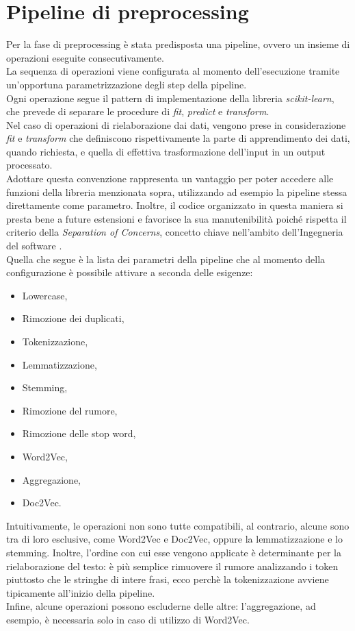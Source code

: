 \documentclass[12pt]{report}
\theoremstyle{definition}
\begin{document}
\section{Pipeline di preprocessing}\label{pipeline}
Per la fase di preprocessing è stata predisposta una pipeline, ovvero un insieme di operazioni eseguite consecutivamente.
\\
La sequenza di operazioni viene configurata al momento dell'esecuzione tramite un'opportuna parametrizzazione degli step della pipeline.
\\
Ogni operazione segue il pattern di implementazione della libreria \textit{scikit-learn}, che prevede di separare le procedure di \textit{fit}, \textit{predict} e \textit{transform}.
\\
Nel caso di operazioni di rielaborazione dai dati, vengono prese in considerazione \textit{fit} e \textit{transform} che definiscono rispettivamente la parte di apprendimento dei dati, quando richiesta, e quella di effettiva trasformazione dell'input in un output processato.
\\
Adottare questa convenzione rappresenta un vantaggio per poter accedere alle funzioni della libreria menzionata sopra, utilizzando ad esempio la pipeline stessa direttamente come parametro.
Inoltre, il codice organizzato in questa maniera si presta bene a future estensioni e favorisce la sua manutenibilità poiché rispetta il criterio della \textit{Separation of Concerns}, concetto chiave nell'ambito dell'Ingegneria del software \cite{32}.
\\
Quella che segue è la lista dei parametri della pipeline che al momento della configurazione è possibile attivare a seconda delle esigenze:
\begin{itemize}
    \item Lowercase,
    \item Rimozione dei duplicati,
    \item Tokenizzazione,
    \item Lemmatizzazione,
    \item Stemming,
    \item Rimozione del rumore,
    \item Rimozione delle stop word,
    \item Word2Vec,
    \item Aggregazione,
    \item Doc2Vec.
\end{itemize}
Intuitivamente, le operazioni non sono tutte compatibili, al contrario, alcune sono tra di loro esclusive, come Word2Vec e Doc2Vec, oppure la lemmatizzazione e lo stemming.
Inoltre, l'ordine con cui esse vengono applicate è determinante per la rielaborazione del testo: è più semplice rimuovere il rumore analizzando i token piuttosto che le stringhe di intere frasi, ecco perchè la tokenizzazione avviene tipicamente all'inizio della pipeline.\\
Infine, alcune operazioni possono escluderne delle altre: l'aggregazione, ad esempio, è necessaria solo in caso di utilizzo di Word2Vec.
\end{document}
